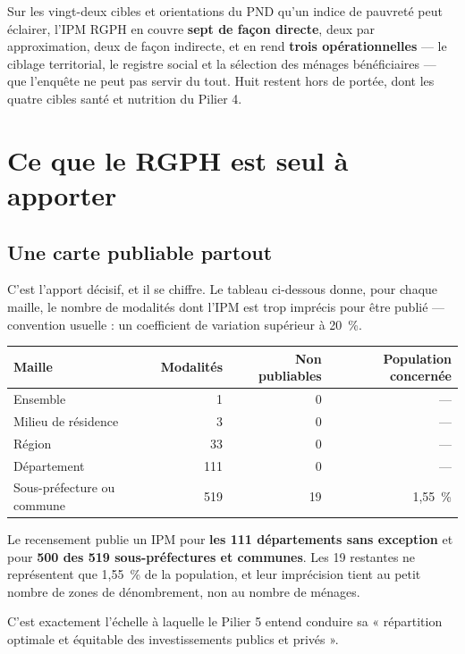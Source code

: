 \documentclass[11pt,a4paper]{article}
\begin{document}
\begin{retenir}[Le décompte]
Sur les vingt-deux cibles et orientations du PND qu'un indice de pauvreté peut éclairer, l'IPM
RGPH en couvre \textbf{sept de façon directe}, deux par approximation, deux de façon indirecte, et
en rend \textbf{trois opérationnelles} — le ciblage territorial, le registre social et la sélection
des ménages bénéficiaires — que l'enquête ne peut pas servir du tout. Huit restent hors de portée,
dont les quatre cibles santé et nutrition du Pilier 4.
\end{retenir}

\section{Ce que le RGPH est seul à apporter}

\subsection{Une carte publiable partout}

C'est l'apport décisif, et il se chiffre. Le tableau ci-dessous donne, pour chaque maille, le
nombre de modalités dont l'IPM est trop imprécis pour être publié --- convention usuelle : un
coefficient de variation supérieur à 20~\%.

\begin{center}
\begin{tabular}{@{}lrrr@{}}
\toprule
\textbf{Maille} & \textbf{Modalités} & \textbf{Non publiables} & \textbf{Population concernée} \\
\midrule
Ensemble & 1 & 0 & --- \\
Milieu de résidence & 3 & 0 & --- \\
Région & 33 & 0 & --- \\
Département & 111 & 0 & --- \\
Sous-préfecture ou commune & 519 & 19 & 1,55~\% \\
\bottomrule
\end{tabular}
\end{center}

\begin{retenir}
Le recensement publie un IPM pour \textbf{les 111 départements sans exception} et pour
\textbf{500 des 519 sous-préfectures et communes}. Les 19 restantes ne représentent que 1,55~\% de
la population, et leur imprécision tient au petit nombre de zones de dénombrement, non au nombre de
ménages.

C'est exactement l'échelle à laquelle le Pilier 5 entend conduire sa « répartition optimale et
équitable des investissements publics et privés ».
\end{retenir}
\end{document}

